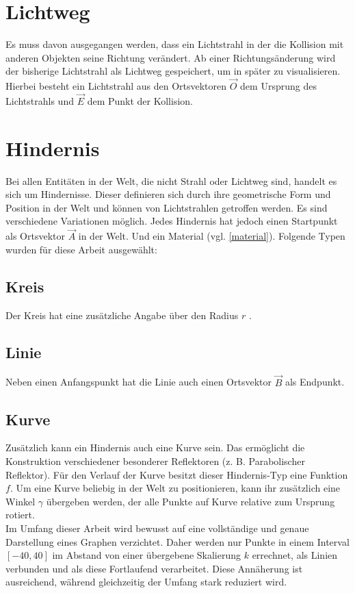 \section{Lichtweg}
Es muss davon ausgegangen werden, dass ein Lichtstrahl in der 
die Kollision mit anderen Objekten seine Richtung verändert. 
Ab einer Richtungsänderung wird der bisherige Lichtstrahl als Lichtweg  
gespeichert, um in später zu visualisieren.
Hierbei besteht ein Lichtstrahl aus den Ortsvektoren $ \vec{O} $  dem 
Ursprung des Lichtstrahls und $ \vec{E} $  dem Punkt der Kollision.

\section{Hindernis}
Bei allen Entitäten in der Welt, die nicht Strahl oder Lichtweg sind, 
handelt es sich um Hindernisse. 
Dieser definieren sich durch ihre geometrische Form und Position in der Welt 
und können von Lichtstrahlen getroffen werden.
Es sind verschiedene Variationen möglich. Jedes Hindernis  
hat jedoch einen Startpunkt als Ortsvektor $ \vec{A} $  in der Welt. 
Und ein Material  (vgl. \ref{material}). 
Folgende Typen wurden für diese Arbeit ausgewählt: 

\subsection{Kreis}
Der Kreis  hat eine zusätzliche Angabe über den Radius $ r $ .

\subsection{Linie}
Neben einen Anfangspunkt hat die Linie  auch einen Ortsvektor $ \vec{B} $ als Endpunkt. 

\subsection{Kurve}
Zusätzlich kann ein Hindernis auch eine Kurve  sein. 
Das ermöglicht die Konstruktion verschiedener besonderer Reflektoren (z. B. Parabolischer Reflektor).
Für den Verlauf der Kurve besitzt dieser Hindernis-Typ eine Funktion $ f $. 
Um eine Kurve beliebig in der Welt zu positionieren, kann ihr zusätzlich eine Winkel $ \gamma $  übergeben werden, 
der alle Punkte auf Kurve relative zum Ursprung rotiert. \\
Im Umfang dieser Arbeit wird bewusst auf eine vollständige und genaue Darstellung eines Graphen verzichtet. 
Daher werden nur Punkte in einem Interval $ [-40, 40] $ im Abstand von einer übergebene Skalierung $ k $  errechnet, 
als Linien verbunden und als diese Fortlaufend verarbeitet. 
Diese Annäherung ist ausreichend, während gleichzeitig der Umfang stark reduziert wird.


